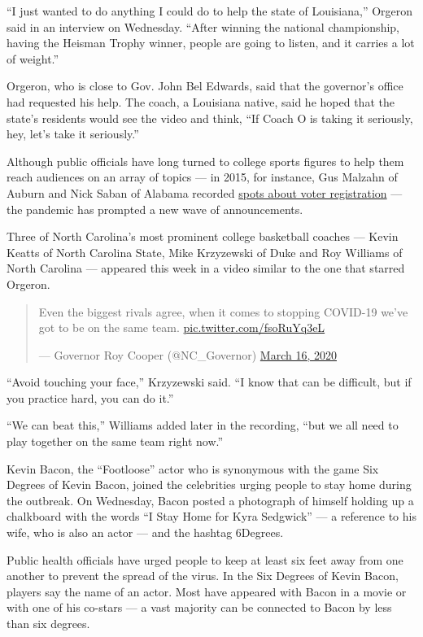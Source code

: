 ``I just wanted to do anything I could do to help the state of
Louisiana,'' Orgeron said in an interview on Wednesday. ``After winning
the national championship, having the Heisman Trophy winner, people are
going to listen, and it carries a lot of weight.''

Orgeron, who is close to Gov. John Bel Edwards, said that the governor's
office had requested his help. The coach, a Louisiana native, said he
hoped that the state's residents would see the video and think, ``If
Coach O is taking it seriously, hey, let's take it seriously.''

Although public officials have long turned to college sports figures to
help them reach audiences on an array of topics --- in 2015, for
instance, Gus Malzahn of Auburn and Nick Saban of Alabama recorded
\href{https://www.ledger-enquirer.com/news/local/news-columns-blogs/article32974485.html}{spots
about voter registration} --- the pandemic has prompted a new wave of
announcements.

Three of North Carolina's most prominent college basketball coaches ---
Kevin Keatts of North Carolina State, Mike Krzyzewski of Duke and Roy
Williams of North Carolina --- appeared this week in a video similar to
the one that starred Orgeron.

\begin{quote}
Even the biggest rivals agree, when it comes to stopping COVID-19 we've
got to be on the same team.
\href{https://t.co/fsoRuYq3eL}{pic.twitter.com/fsoRuYq3eL}

--- Governor Roy Cooper (@NC\_Governor)
\href{https://twitter.com/NC_Governor/status/1239683368868028428?ref_src=twsrc\%5Etfw}{March
16, 2020}
\end{quote}

``Avoid touching your face,'' Krzyzewski said. ``I know that can be
difficult, but if you practice hard, you can do it.''

``We can beat this,'' Williams added later in the recording, ``but we
all need to play together on the same team right now.''

Kevin Bacon, the ``Footloose'' actor who is synonymous with the game Six
Degrees of Kevin Bacon, joined the celebrities urging people to stay
home during the outbreak. On Wednesday, Bacon posted a photograph of
himself holding up a chalkboard with the words ``I Stay Home for Kyra
Sedgwick'' --- a reference to his wife, who is also an actor --- and the
hashtag 6Degrees.

Public health officials have urged people to keep at least six feet away
from one another to prevent the spread of the virus. In the Six Degrees
of Kevin Bacon, players say the name of an actor. Most have appeared
with Bacon in a movie or with one of his co-stars --- a vast majority
can be connected to Bacon by less than six degrees.

